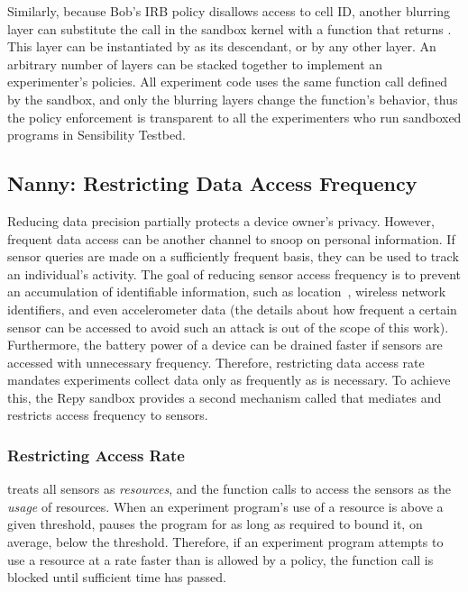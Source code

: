 Similarly, because Bob's IRB policy disallows access to cell ID, another blurring layer 
can substitute the  call in the sandbox kernel with a function that
returns . This layer can be instantiated by 
as its descendant, or by any other layer. An arbitrary number of layers can 
be stacked together to implement an experimenter's policies.
%
All experiment code uses the same function call defined by the sandbox, 
and only the blurring layers change the function's behavior, thus 
the policy enforcement is transparent to all the experimenters who run 
sandboxed programs in Sensibility Testbed.

\subsection{Nanny: Restricting Data Access Frequency}\label{sec-nanny}

Reducing data precision partially protects a device owner's privacy. However, frequent data 
access can be another channel to snoop on personal information.
If sensor queries are made on a sufficiently frequent basis, they can be used
to track an individual's activity. The goal of reducing sensor access frequency 
is to prevent an accumulation of identifiable information, such as 
location~\cite{gruteser2003anonymous}, wireless network identifiers, and even 
accelerometer data (the 
details about how frequent a certain sensor can be accessed to avoid such an 
attack is out of the scope of this work). 
Furthermore, the battery power of a device can 
be drained faster if sensors are accessed
with unnecessary frequency. Therefore, restricting data access rate 
mandates experiments collect data only as frequently as is necessary. 
To achieve this, the Repy sandbox provides a second mechanism
called  that mediates and restricts access frequency to sensors. 

\subsubsection{Restricting Access Rate}

 treats all sensors as \textit{resources}, and the function calls to 
access the sensors as the \textit{usage} of resources. 
When an 
experiment program's use of a resource is above a given threshold, 
 pauses the 
program for as long as required to bound it, on average, below the
threshold. Therefore, if an experiment program attempts to 
use a resource at a rate faster than is allowed by a policy, the function 
call is blocked until sufficient time has passed. 

